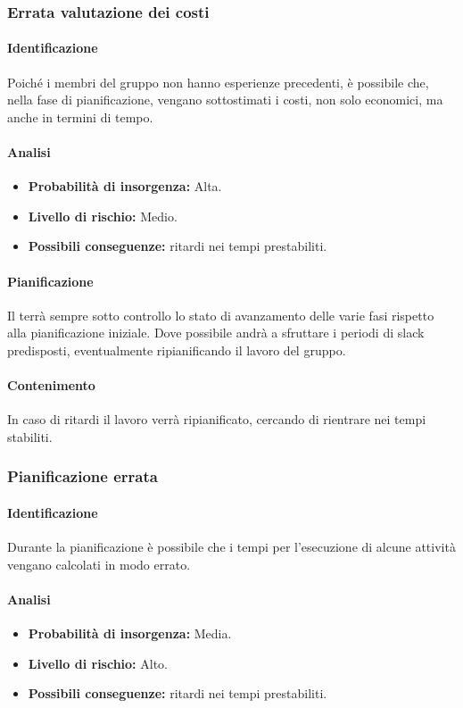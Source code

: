 \subsubsection{Errata valutazione dei costi}
\paragraph {Identificazione}
Poiché i membri del gruppo non hanno esperienze precedenti, è possibile che, nella fase di pianificazione, vengano sottostimati i costi, non solo economici, ma anche in termini di tempo.

\paragraph {Analisi}
\begin{itemize}
	\item \textbf{Probabilità di insorgenza:} Alta.
	\item \textbf{Livello di rischio:} Medio.
	\item \textbf{Possibili conseguenze:} ritardi nei tempi prestabiliti.
\end{itemize}

\paragraph {Pianificazione}
Il \RdP{} terrà sempre sotto controllo lo stato di avanzamento delle varie fasi rispetto alla pianificazione iniziale. Dove possibile andrà a sfruttare i periodi di slack predisposti, eventualmente ripianificando il lavoro del gruppo.

\paragraph {Contenimento}
In caso di ritardi il lavoro verrà ripianificato, cercando di rientrare nei tempi stabiliti.

\subsubsection{Pianificazione errata}
\paragraph {Identificazione}
Durante la pianificazione è possibile che i tempi per l'esecuzione di alcune attività vengano calcolati in modo errato.

\paragraph {Analisi}
\begin{itemize}
	\item \textbf{Probabilità di insorgenza:} Media.
	\item \textbf{Livello di rischio:} Alto.
	\item \textbf{Possibili conseguenze:} ritardi nei tempi prestabiliti.
\end{itemize}

